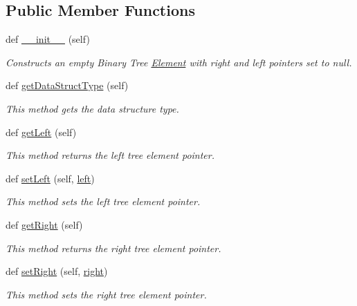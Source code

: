 \subsection*{Public Member Functions}
\begin{DoxyCompactItemize}
\item 
def \hyperlink{class_bin_tree_element_1_1_bin_tree_element_a9a6be9d4770ea3113e0e622b0d71a035}{\+\_\+\+\_\+init\+\_\+\+\_\+} (self)
\begin{DoxyCompactList}\small\item\em Constructs an empty Binary Tree \hyperlink{namespace_element}{Element} with right and left pointers set to null. \end{DoxyCompactList}\item 
def \hyperlink{class_bin_tree_element_1_1_bin_tree_element_a74e275475f366145d4987458ad08841b}{get\+Data\+Struct\+Type} (self)
\begin{DoxyCompactList}\small\item\em This method gets the data structure type. \end{DoxyCompactList}\item 
def \hyperlink{class_bin_tree_element_1_1_bin_tree_element_a8515226277b5632baf3f0a57c0095fa6}{get\+Left} (self)
\begin{DoxyCompactList}\small\item\em This method returns the left tree element pointer. \end{DoxyCompactList}\item 
def \hyperlink{class_bin_tree_element_1_1_bin_tree_element_a9d8856b4d16a7ba680ad699cc4328cd6}{set\+Left} (self, \hyperlink{class_bin_tree_element_1_1_bin_tree_element_a73a75929ad5c317a59915283866ddb7a}{left})
\begin{DoxyCompactList}\small\item\em This method sets the left tree element pointer. \end{DoxyCompactList}\item 
def \hyperlink{class_bin_tree_element_1_1_bin_tree_element_a292647759d9bd7f705e6240afed1b707}{get\+Right} (self)
\begin{DoxyCompactList}\small\item\em This method returns the right tree element pointer. \end{DoxyCompactList}\item 
def \hyperlink{class_bin_tree_element_1_1_bin_tree_element_a64f9dabb9089c9fd5b94a6cc6c262944}{set\+Right} (self, \hyperlink{class_bin_tree_element_1_1_bin_tree_element_a9e5201df4cc9cc2a970b35ba036bca5a}{right})
\begin{DoxyCompactList}\small\item\em This method sets the right tree element pointer. \end{DoxyCompactList}\end{DoxyCompactItemize}
